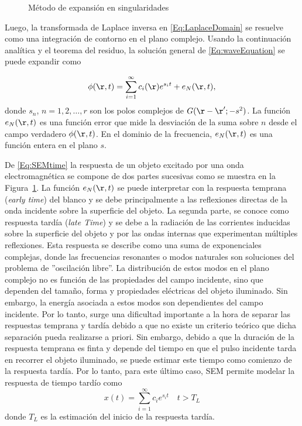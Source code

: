 \begin{figure}[t]
	\centering
	\resizebox{\linewidth}{!}{}
	\caption{Método de expansión en singularidades}
	\label{Fig:SEM}	
\end{figure}


Luego, la transformada de Laplace inversa en \eqref{Eq:LaplaceDomain}  se resuelve como una integración de contorno en el plano complejo. Usando la continuación analítica y el teorema del residuo, la solución general de \eqref{Eq:waveEquation} se puede expandir como

\begin{equation}
	\phi(\r,t) = \sum_{i=1}^{\infty}c_i(\r)e^{s_it} + e_N(\r,t),
	\label{Eq:SEMtime}
\end{equation}
donde $s_n$, $n=1,2,\ldots,r$ son los polos complejos de $G(\r-\r';-s^2)$. La función $e_N(\r,t)$ es una función error que mide la desviación de la suma sobre $n$ desde el campo verdadero $\phi(\r,t)$. En el dominio de la frecuencia, $e_N(\r,t)$ es una función entera en el plano $s$.

De \eqref{Eq:SEMtime} la respuesta de un objeto excitado por una onda electromagnética se compone de dos partes sucesivas como se muestra en la Figura~\ref{Fig:SEM}. La función $e_N(\r,t)$ se puede interpretar con la respuesta temprana (\emph{early time}) del blanco y se debe principalmente a las reflexiones directas de la onda incidente sobre la superficie del objeto. La segunda parte, se conoce como respuesta tardía (\emph{late Time}) y se debe a la radiación de las corrientes inducidas sobre la superficie del objeto y  por las ondas internas que experimentan múltiples reflexiones. Esta respuesta se describe como una suma de exponenciales complejas, donde las frecuencias resonantes o modos naturales son soluciones del problema de ''oscilación libre''. La distribución de estos modos en el plano complejo no es función de las propiedades del campo incidente, sino que dependen del tamaño, forma y propiedades eléctricas del objeto iluminado. Sin embargo, la energía asociada a estos modos son dependientes del campo incidente. Por lo tanto, surge una dificultad importante a la hora de separar las respuestas temprana y tardía debido a que no existe un criterio teórico que dicha separación pueda realizarse a priori. Sin embargo, debido a que la duración de la respuesta temprana es finta y depende del tiempo en que el pulso incidente tarda en recorrer el objeto iluminado, se puede estimar este tiempo como comienzo de la respuesta tardía. Por lo tanto, para este último caso, SEM permite modelar la respuesta de tiempo tardío como
\begin{equation}
	x(t) = \sum_{i=1}^{\infty}c_ie^{s_it} \quad t> T_L
	\label{Eq:SEM_LateTime}
\end{equation}
donde $T_L$ es la estimación del inicio de la respuesta tardía. 


